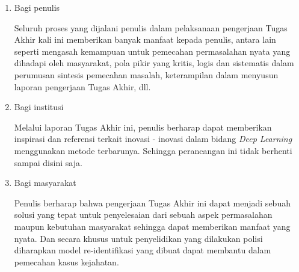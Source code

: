 \begin{enumerate}[nolistsep]
  
  \item Bagi penulis
  
  Seluruh proses yang dijalani penulis dalam pelaksanaan pengerjaan Tugas Akhir
  kali ini memberikan banyak manfaat kepada penulis, antara lain seperti mengasah
  kemampuan untuk pemecahan permasalahan nyata yang dihadapi oleh masyarakat,
  pola pikir yang kritis, logis dan sistematis dalam perumusan sintesis pemecahan
  masalah, keterampilan dalam menyusun laporan pengerjaan Tugas Akhir, dll.
  \item Bagi institusi
  
  Melalui laporan Tugas Akhir ini, penulis berharap dapat memberikan inspirasi dan
  referensi terkait inovasi - inovasi dalam bidang \emph{Deep Learning} menggunakan 
  metode terbarunya. Sehingga perancangan ini tidak berhenti sampai disini saja.
  \item Bagi masyarakat
  
  Penulis berharap bahwa pengerjaan Tugas Akhir ini dapat menjadi sebuah solusi yang 
  tepat untuk penyelesaian dari sebuah aspek permasalahan
  maupun kebutuhan masyarakat sehingga dapat memberikan manfaat yang nyata.
  Dan secara khusus untuk penyelidikan yang dilakukan polisi diharapkan model re-identifikasi yang dibuat
  dapat membantu \linebreak dalam pemecahan kasus kejahatan.
  
\end{enumerate}









